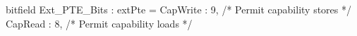 bitfield Ext_PTE_Bits : extPte = {
  CapWrite     : 9, /* Permit capability stores */
  CapRead      : 8, /* Permit capability loads */
}
